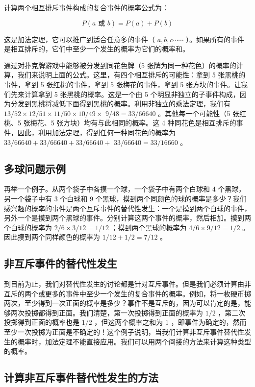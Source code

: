 计算两个相互排斥事件构成的复合事件的概率公式为：

$$
P(a \text { 或 } b)=P(a)+P(b)
$$

这是加法定理，它可以推广到适合任意多的事件（ $a, b, c \cdots \cdots$ ）。如果所有的事件是相互排斥的，它们中至少一个发生的概率为它们的概率和。

通过对扑克牌游戏中能够被分发到同花色牌（5 张牌为同一种花色）的概率的计算，我们来说明上面的公式。这里，有四个相互排斥的可能性：拿到 5 张黑桃的事件，拿到 5 张红桃的事件，拿到 5 张梅花的事件，拿到 5 张方块的事件。让我们先来计算拿到 5 张黑桃的概率。这是一个由 5 个明显非独立的子事件构成，因为分发到黑桃将减低下面得到黑桃的概率。利用非独立的乘法定理，我们有 $13 / 52 \times 12 / 51 \times 11 / 50 \times 10 / 49 \times$ $9 / 48=33 / 66640$ 。其他每一个可能性（5 张红桃、5 张梅花、5 张方块）均有与此相同的概率。这 4 种同花色是相互排斥的事件，因此，利用加法定理，得到任何一种同花色的概率为 $33 / 66640+33 / 66640+33 / 66640+$ $33 / 66640=33 / 16660$ 。

\subsection{多球问题示例}

再举一个例子。从两个袋子中各摸一个球，一个袋子中有两个白球和 4 个黑球，另一个袋子中有 3 个白球和 9 个黑球，摸到两个同颜色的球的概率是多少？我们感兴趣的概率的事件是两个互斥事件的替代性发生：一个是摸到两个白球的事件，另外一个是摸到两个黑球的事件。分别计算这两个事件的概率，然后相加。摸到两个白球的概率为 $2 / 6 \times 3 / 12=1 / 12$ ；摸到两个黑球的概率为 $4 / 6 \times 9 / 12=1 / 2$ 。因此摸到两个同样颜色的概率为 $1 / 12+1 / 2=7 / 12$ 。

\subsection{非互斥事件的替代性发生}

到目前为止，我们对替代性发生的讨论都是针对互斥事件。但是我们必须计算由非互斥的两个或更多的事件中至少一个发生的复合事件的概率。例如，将一枚硬币掷两次，至少得到一次正面的概率是多少？事件不是互斥的，因为可以肯定的是，能够两次投掷都得到正面。我们清楚，第一次投掷得到正面的概率为 $1 / 2$ ，第二次投掷得到正面的概率也是 $1 / 2$ ，但这两个概率之和为 1 ，即事件为确定的，然而至少一次投掷为正面是不确定的！这个例子说明，当我们计算非互斥事件替代性发生的概率时，加法定理不能直接应用。我们可以用两个间接的方法来计算这种类型的概率。

\subsection{计算非互斥事件替代性发生的方法}

